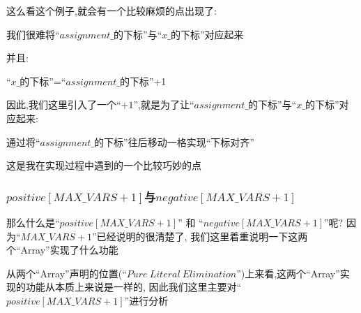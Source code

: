         这么看这个例子,就会有一个比较麻烦的点出现了:
        \begin{center}
            我们很难将``$assignment\_$的下标''与``$x\_$的下标''对应起来
        \end{center}
        \noindent
        并且:
        \begin{center}
            ``$x\_$的下标''=``$assignment\_$的下标''+1
        \end{center}
        因此,我们这里引入了一个``$+1$'',就是为了让``$assignment\_$的下标''与``$x\_$的下标''对应起来:
        \begin{center}
            通过将``$assignment\_$的下标''往后移动一格实现``下标对齐''
        \end{center}
        \noindent
        这是我在实现过程中遇到的一个比较巧妙的点
        \subsubsection{$positive[MAX\_VARS + 1]$与$negative[MAX\_VARS + 1]$} 
        那么什么是``$positive[MAX\_VARS + 1]$'' 和  ``$negative[MAX\_VARS + 1]$''呢?
        因为``$MAX\_VARS + 1$''已经说明的很清楚了,
        我们这里着重说明一下这两个``Array''实现了什么功能\par
        从两个``Array''声明的位置(``$Pure \ Literal \ Elimination$'')上来看,这两个``Array''实现的功能从本质上来说是一样的,
        因此我们这里主要对``$positive[MAX\_VARS + 1]$''进行分析
    